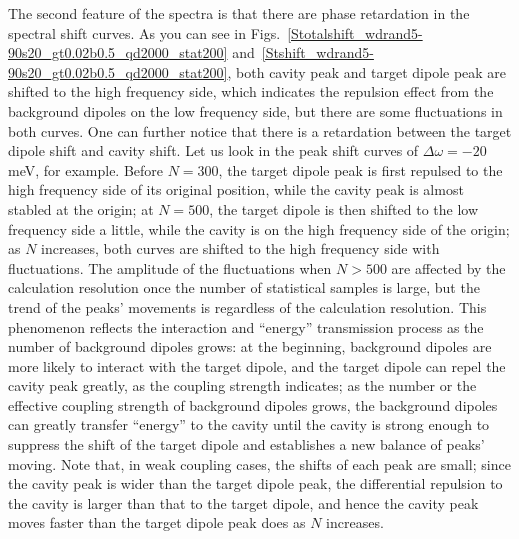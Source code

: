 The second feature of the spectra is that there are phase retardation in the spectral shift curves. As you can see in Figs.~\ref{Stotalshift_wdrand5-90s20_gt0.02b0.5_qd2000_stat200} and~\ref{Stshift_wdrand5-90s20_gt0.02b0.5_qd2000_stat200}, both cavity peak and target dipole peak are shifted to the high frequency side, which indicates the repulsion effect from the background dipoles on the low frequency side, but there are some fluctuations in both curves. One can further notice that there is a retardation between the target dipole shift and cavity shift. Let us look in the peak shift curves of $\Delta\omega=-20$ meV, for example. Before $N=300$, the target dipole peak is first repulsed to the high frequency side of its original position, while the cavity peak is almost stabled at the origin; at $N=500$, the target dipole is then shifted to the low frequency side a little, while the cavity is on the high frequency side of the origin; as $N$ increases, both curves are shifted to the high frequency side with fluctuations. The amplitude of the fluctuations when $N>500$ are affected by the calculation resolution once the number of statistical samples is large, but the trend of the peaks' movements is regardless of the calculation resolution. This phenomenon reflects the interaction and ``energy'' transmission process as the number of background dipoles grows: at the beginning, background dipoles are more likely to interact with the target dipole, and the target dipole can repel the cavity peak greatly, as the coupling strength indicates; as the number or the effective coupling strength of background dipoles grows, the background dipoles can greatly transfer ``energy'' to the cavity until the cavity is strong enough to suppress the shift of the target dipole and establishes a new balance of peaks' moving. Note that, in weak coupling cases, the shifts of each peak are small; since the cavity peak is wider than the target dipole peak, the differential repulsion to the cavity is larger than that to the target dipole, and hence the cavity peak moves faster than the target dipole peak does as $N$ increases.




